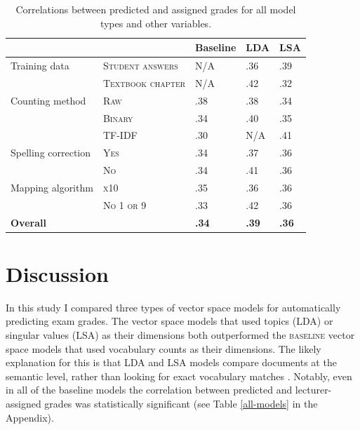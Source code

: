 \documentclass[a4paper,10pt,twoside]{article}
\begin{document}
\begin{table}[h]
	\caption{Correlations between predicted and assigned grades for all model types and other variables.}
	\label{table1}
	\centering
	\begin{tabular}{lllll}
		\hline  &  & \textbf{Baseline} & \textbf{LDA} & \textbf{LSA} \\ 
		\hline  Training data & \textsc{Student answers} & N/A & .36 & .39 \\ 
		& \textsc{Textbook chapter} & N/A & .42 & .32 \\ 
		\hline  Counting method & \textsc{Raw} & .38 & .38 & .34 \\ 
		& \textsc{Binary} & .34 & .40 & .35 \\ 
		& TF-IDF & .30 & N/A & .41 \\ 
		\hline  Spelling correction & \textsc{Yes} & .34 & .37 & .36 \\ 
		& \textsc{No} & .34 & .41 & .36 \\ 
		\hline  Mapping algorithm & \textsc{x10} & .35 & .36 & .36 \\ 
		& \textsc{No 1 or 9} & .33 & .42 & .36 \\ 
		\hline  \textbf{Overall} &  & \textbf{.34} & \textbf{.39} & \textbf{.36} \\ 
		\hline 
	\end{tabular} 
\end{table}

\newpage
\section{Discussion}
In this study I compared three types of vector space models for automatically predicting exam grades. The vector space models that used topics (LDA) or singular values (LSA) as their dimensions both outperformed the \textsc{baseline} vector space models that used vocabulary counts as their dimensions. The likely explanation for this is that LDA and LSA models compare documents at the semantic level, rather than looking for exact vocabulary matches \cite{kakkonen2008}. Notably, even in all of the baseline models the correlation between predicted and lecturer-assigned grades was statistically significant (see Table \ref{all-models} in the Appendix).
\end{document}
